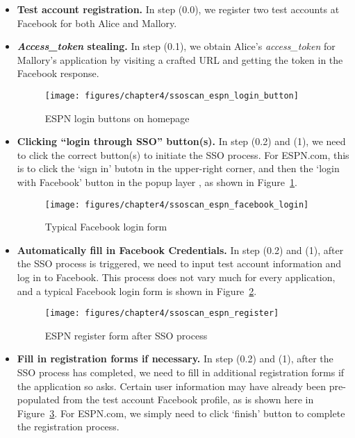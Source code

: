 \begin{itemize}

\item \textbf{Test account registration.}  In step (0.0), we register two test accounts at Facebook for both Alice and Mallory.

\item \textbf{\emph{Access\_token} stealing.}  In step (0.1), we obtain Alice's \emph{access\_token} for Mallory's application by visiting a crafted URL and getting the token in the Facebook response.

\begin{figure}[hbt]
\centering
\texttt{[image: figures/chapter4/ssoscan\_espn\_login\_button]}
\caption{ESPN login buttons on homepage}
\label{fig:ssoscan_espn_login_button}
\end{figure}

\item \textbf{Clicking ``login through SSO'' button(s).}  In step (0.2) and (1), we need to click the correct button(s) to initiate the SSO process.  For ESPN.com, this is to click the `sign in' butotn in the upper-right corner, and then the `login with Facebook' button in the popup layer , as shown in Figure~\ref{fig:ssoscan_espn_login_button}.

\begin{figure}[hbt]
\centering
\texttt{[image: figures/chapter4/ssoscan\_espn\_facebook\_login]}
\caption{Typical Facebook login form}
\label{fig:ssoscan_espn_facebook_login}
\end{figure}

\item \textbf{Automatically fill in Facebook Credentials.}  In step (0.2) and (1), after the SSO process is triggered, we need to input test account information and log in to Facebook.  This process does not vary much for every application, and a typical Facebook login form is shown in Figure~\ref{fig:ssoscan_espn_facebook_login}.

\begin{figure}[hbt]
\centering
\texttt{[image: figures/chapter4/ssoscan\_espn\_register]}
\caption{ESPN register form after SSO process}
\label{fig:ssoscan_espn_register}
\end{figure}

\item \textbf{Fill in registration forms if necessary.}  In step (0.2) and (1), after the SSO process has completed, we need to fill in additional registration forms if the application so asks.  Certain user information may have already been pre-populated from the test account Facebook profile, as is shown here in Figure~\ref{fig:ssoscan_espn_register}.  For ESPN.com, we simply need to click `finish' button to complete the registration process.


\end{itemize}
